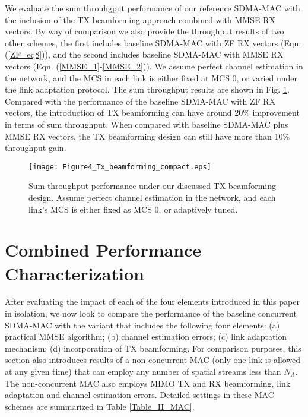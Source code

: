 \documentclass[journal, final]{IEEEtran}
\begin{document}
We evaluate the sum throuhgput performance of our reference SDMA-MAC with
the inclusion of the TX beamforming approach combined with MMSE RX vectors. By way of comparison we
also provide the throughput results of two other schemes, the first includes
baseline SDMA-MAC with ZF RX vectors (Eqn. (\ref{ZF_eq8})), and the second includes baseline SDMA-MAC with MMSE RX vectors (Eqn. (\ref{MMSE_1}-\ref{MMSE_2})). We assume perfect channel estimation in the network,
and the MCS in each link is either fixed at MCS 0, or varied under the
link adaptation protocol. The sum throughput results are
shown in Fig. \ref{Fig4_Tx_beamforming}. Compared with the performance of the baseline SDMA-MAC
with ZF RX vectors, the introduction of TX
beamforming can have around 20{\%} improvement in terms of sum throughput.
When compared with baseline SDMA-MAC plus MMSE RX vectors,
the TX beamforming design can still have more than 10{\%} throughput gain.

\begin{figure}
\centering
\texttt{[image: Figure4\_Tx\_beamforming\_compact.eps]}
\caption{Sum throughput performance under our discussed TX beamforming design. Assume perfect channel estimation in the network, and each link's MCS is either fixed as MCS 0, or adaptively tuned.}
\label{Fig4_Tx_beamforming}
\end{figure}

\section{Combined Performance Characterization}

After evaluating the impact of each of the four elements introduced in this
paper in isolation, we now look to compare the performance of the baseline
concurrent SDMA-MAC with the variant that includes the following four
elements: (a) practical MMSE algorithm; (b) channel estimation errors; (c) link
adaptation mechanism; (d) incorporation of TX beamforming. For comparison
purposes, this section also introduces results of a non-concurrent MAC (only one link is allowed at any given time) that can employ any number of spatial streams less than $N_A$. The non-concurrent MAC also employs  MIMO TX and RX beamforming, link adaptation and channel estimation
errors. Detailed settings in these MAC schemes are summarized in Table \ref{Table_II_MAC}.
\end{document}

